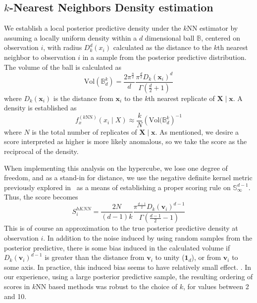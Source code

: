 \subsection{$k$-Nearest Neighbors Density estimation}
We establish a local posterior predictive density under the $k$NN estimator by 
  assuming a locally uniform density within a $d$ dimensional ball $\mathbb{B}$, 
  centered on observation $i$, with radius $D_{k}^d(x_i)$ calculated as the 
  distance to the $k$th nearest neighbor to observation $i$ in a sample from the 
  posterior predictive distribution. The volume of the ball is calculated as
  \begin{equation}
    \label{eq:vol_sphere}
    \text{Vol}(\mathbb{B}_d^k) = 
      \frac{2\pi^{\frac{n}{2}}}{d}
      \frac{\pi^{\frac{d}{2}}D_{k}(\bm{x}_i)^d}{\Gamma\left(\frac{d}{2} + 1\right)}
  \end{equation}
  where $D_k(\bm{x}_i)$ is the distance from $\bm{x}_i$ to the $k$th nearest 
  replicate of $\bm{X}\mid\bm{x}$.  A density is established as 
  \begin{equation}
    \label{eq:ad_knn}
    f_{x}^{(k\text{NN})}(x_i\mid X) \approx \frac{k}{N}\left(\text{Vol}(\mathbb{B}_d^k\right)^{-1}
    \end{equation}
  where $N$ is the total number of replicates of $\bm{X}\mid\bm{x}$.  As 
  mentioned, we desire a score interpreted as higher is more likely anomalous, 
  so we take the score as the reciprocal of the density.

When implementing this analysis on the hypercube, we lose one degree of freedom,
  and as a stand-in for distance, we use the negative definite kernel metric 
  previously explored in~\cite{trubey:pg} as a means of establishing a proper 
  scoring rule on $\mathbb{S}_{\infty}^{d-1}$.  Thus, the score becomes
  \begin{equation}
    \label{eq:ad_knn_h}
    S_i^{hKNN} = \frac{2N}{(d-1)k}
    \frac{\pi^{\frac{d-1}{2}}D_{k}(\bm{v}_i)^{d-1}}{\Gamma\left(\frac{d-1}{2} - 1\right)}
  \end{equation}
  This is of course an approximation to the true posterior predictive density at
  observation $i$.  In addition to the noise induced by using random samples
  from the posterior predictive, there is some bias induced in the calculated volume
  if $D_k(\bm{v}_i)^{d-1}$ is greater than the distance from $\bm{v}_i$ to 
  unity ($\bm{1}_d$), or from $\bm{v}_i$ to some axis.  In practice,
  this induced bias seems to have relatively small effect. 
  .
  In our experience, using a large posterior predictive sample, the resulting 
  ordering of scores in $k$NN based methods was robust to the choice of $k$, for 
  values between 2 and 10.

